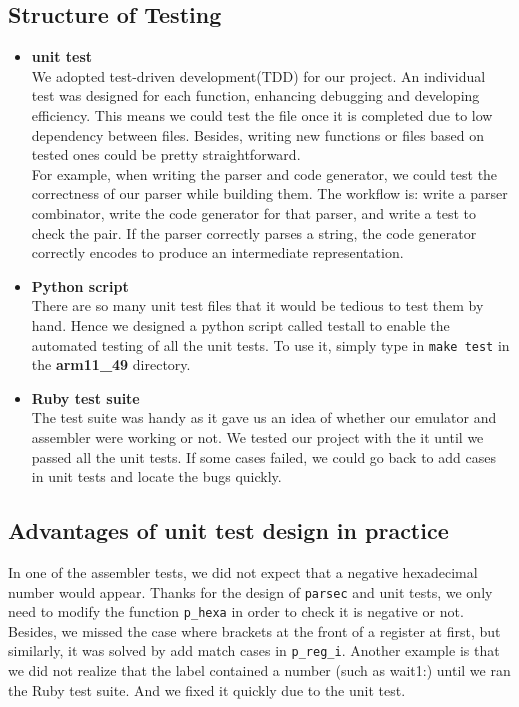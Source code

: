 \documentclass{article}
\begin{document}
\subsection{Structure of Testing}
\begin{itemize}
    \item \textbf{unit test} \\
    We adopted test-driven development(TDD) for our project. An individual test was designed for each function, enhancing debugging and developing efficiency. This means we could test the file once it is completed due to low dependency between files. Besides, writing new functions or files based on tested ones could be pretty straightforward. 
    \\For example, when writing the parser and code generator, we could test the correctness of our parser while building them.
    The workflow is: write a parser combinator, write the code generator for that parser, and write a test to check the pair. If the parser correctly parses a string, the code generator correctly encodes to produce an intermediate representation.

    \item \textbf{Python script} \\
    There are so many unit test files that it would be tedious to test them by hand. Hence we designed a python script called testall to enable the automated testing of all the unit tests. To use it, simply type in \texttt{make test} in the \textbf{arm11\_49} directory.
    \item \textbf{Ruby test suite} \\
    The test suite was handy as it gave us an idea of whether our emulator and assembler were working or not. We tested our project with the it until we passed all the unit tests. If some cases failed, we could go back to add cases in unit tests and locate the bugs quickly.
\end{itemize}
\subsection{Advantages of unit test design in practice}
In one of the assembler tests, we did not expect that a negative hexadecimal number would appear. Thanks for the design of \texttt{parsec} and unit tests, we only need to modify the function \texttt{p\_hexa} in order to check it is negative or not.
Besides, we missed the case where brackets at the front of a register at first, but similarly, it was solved by add match cases in \texttt{p\_reg\_i}.
Another example is that we did not realize that the label contained a number (such as wait1:) until we ran the Ruby test suite. And we fixed it quickly due to the unit test.
\end{document}
